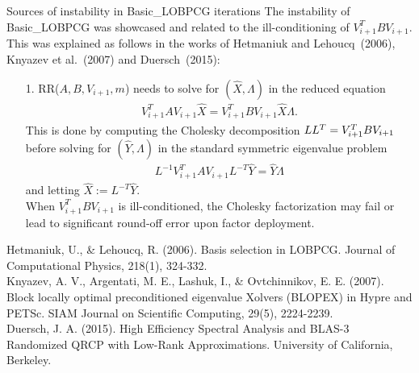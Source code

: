 \documentclass[t,usepdftitle=false]{beamer}
\begin{document}
\begin{frame}{Sources of instability in Basic\_LOBPCG iterations}
	The instability of Basic\_LOBPCG was showcased and related to the ill-conditioning of $V_{i+1}^TBV_{i+1}$. This was explained as follows in the works of Hetmaniuk and Lehoucq~(2006), Knyazev et al.~(2007) and Duersch~(2015):\smallskip
	\begin{enumerate}
		\item[1.] RR($A,B,V_{i+1},m$) needs to solve for $(\hat{X},\Lambda)$ in the reduced equation
		\begin{align*}
			V_{i+1}^TAV_{i+1}\hat{X}=V_{i+1}^TBV_{i+1}\hat{X}\Lambda.
		\end{align*}
		This is done by computing the Cholesky decomposition $LL^T=V_{i+1}^TBV_{i+1}\hspace{-.5cm}$\\
		before solving for $(\hat{Y},\Lambda)$ in the standard symmetric eigenvalue problem
		\begin{align*}
			L^{-1}V_{i+1}^TAV_{i+1}L^{-T}\hat{Y}=\hat{Y}\Lambda
		\end{align*}
		and letting $\hat{X}:=L^{-T}\hat{Y}$.\\\smallskip
		When $V_{i+1}^TBV_{i+1}$ is ill-conditioned, the Cholesky factorization may fail or lead to significant round-off error upon factor deployment.	
	\end{enumerate}	
	\medskip
	\tiny{Hetmaniuk, U., \& Lehoucq, R. (2006). Basis selection in LOBPCG. Journal of Computational Physics, 218(1), 324-332.}\tinyskip\\
	\tiny{Knyazev, A. V., Argentati, M. E., Lashuk, I., \& Ovtchinnikov, E. E. (2007). Block locally optimal preconditioned eigenvalue Xolvers (BLOPEX) in Hypre and PETSc. SIAM Journal on Scientific Computing, 29(5), 2224-2239.}\tinyskip\\	
	\tiny{Duersch, J. A. (2015). High Efficiency Spectral Analysis and BLAS-3 Randomized QRCP with Low-Rank Approximations. University of California, Berkeley.}
\end{frame}
\end{document}
